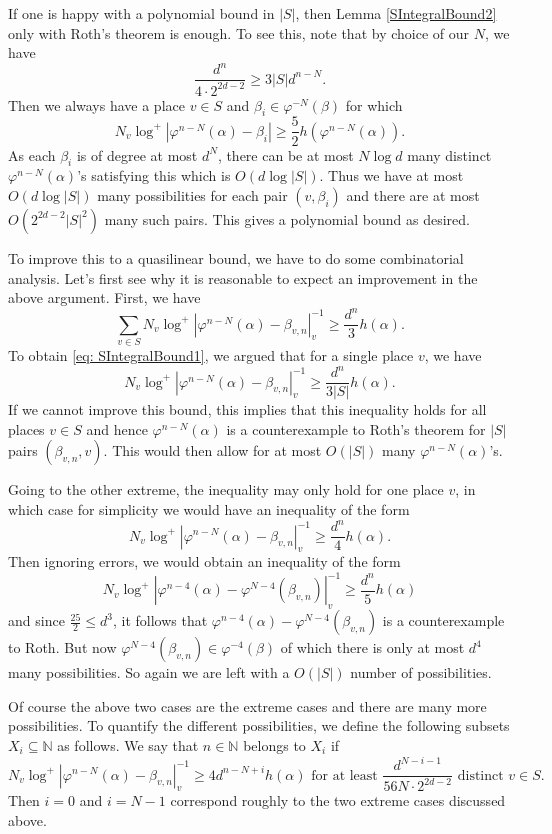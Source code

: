 \documentclass[10pt, reqno]{amsart}
\newcommand{\bb}{\mathbb}
\newcommand{\vphi}{\varphi}
\numberwithin{theorem}{section}
\numberwithin{equation}{section}
\numberwithin{example}{section}
\numberwithin{definition}{section}
\begin{document}
 If one is happy with a polynomial bound in $|S|$, then Lemma \ref{SIntegralBound2} only with Roth's theorem is enough. To see this, note that by choice of our $N$, we have 
 $$\frac{d^n}{4 \cdot 2^{2d-2}} \geq 3|S| d^{n-N}.$$ 
 Then we always have a place $v \in S$ and $\beta_i \in \vphi^{-N}(\beta)$ for which 
 \begin{equation} \label{eq: SIntegralBound1} 
 N_v \log^+|\vphi^{n-N}(\alpha) - \beta_i| \geq \frac{5}{2} h(\vphi^{n-N}(\alpha)).
 \end{equation}
As each $\beta_i$ is of degree at most $d^N$, there can be at most $N \log d$ many distinct $\vphi^{n-N}(\alpha)$'s satisfying this which is $O(d \log |S|)$. Thus we have at most $O(d \log |S|)$ many possibilities for each pair $(v,\beta_i)$ and there are at most $O(2^{2d-2}|S|^2)$ many such pairs. This gives a polynomial bound as desired.
\par 
To improve this to a quasilinear bound, we have to do some combinatorial analysis. Let's first see why it is reasonable to expect an improvement in the above argument. First, we have 
$$\sum_{v \in S} N_v \log^+|\vphi^{n-N}(\alpha) - \beta_{v,n}|^{-1}_v \geq \frac{d^n}{3} h(\alpha).$$
To obtain \eqref{eq: SIntegralBound1}, we argued that for a single place $v$, we have 
$$N_v \log^+|\vphi^{n-N}(\alpha) - \beta_{v,n}|^{-1}_v \geq \frac{d^n}{3|S|} h(\alpha).$$
If we cannot improve this bound, this implies that this inequality holds for all places $v \in S$ and hence $\vphi^{n-N}(\alpha)$ is a counterexample to Roth's theorem for $|S|$ pairs $(\beta_{v,n},v)$. This would then allow for at most $O(|S|)$ many $\vphi^{n-N}(\alpha)$'s. 
\par 
Going to the other extreme, the inequality may only hold for one place $v$, in which case for simplicity we would have an inequality of the form 
$$N_v \log^+|\vphi^{n-N}(\alpha) - \beta_{v,n}|^{-1}_v \geq \frac{d^n}{4}h(\alpha).$$
Then ignoring errors, we would obtain an inequality of the form  
$$N_v \log^+|\vphi^{n-4}(\alpha) - \vphi^{N-4}(\beta_{v,n})|^{-1}_v \geq \frac{d^n}{5} h(\alpha)$$
and since $\frac{25}{2} \leq d^3$, it follows that $\vphi^{n-4}(\alpha) - \vphi^{N-4}(\beta_{v,n})$ is a counterexample to Roth. But now $\vphi^{N-4}(\beta_{v,n}) \in \vphi^{-4}(\beta)$ of which there is only at most $d^4$ many possibilities. So again we are left with a $O(|S|)$ number of possibilities. 
\par 
Of course the above two cases are the extreme cases and there are many more possibilities. To quantify the different possibilities, we define the following subsets $X_i \subseteq \bb{N}$ as follows. We say that $n \in \bb{N}$ belongs to $X_i$ if 
$$N_v \log^+| \vphi^{n-N}(\alpha) - \beta_{v,n}|_v^{-1} \geq 4 d^{n-N+i} h(\alpha)  \text{ for at least } \frac{d^{N-i-1}}{56N \cdot 2^{2d-2}} \text{ distinct } v  \in S.$$
Then $i = 0$ and $i = N-1$ correspond roughly to the two extreme cases discussed above.
\end{document}
